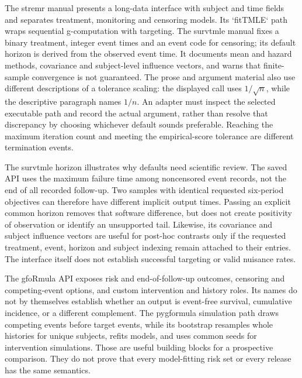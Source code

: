 The stremr manual presents a long-data interface with subject and time fields
and separates treatment, monitoring and censoring models. Its `fitTMLE` path
wraps sequential g-computation with targeting. The survtmle manual fixes a
binary treatment, integer event times and an event code for censoring; its
default horizon is derived from the observed event time. It documents mean and
hazard methods, covariance and subject-level influence vectors, and warns that
finite-sample convergence is not guaranteed. The prose and argument material
also use different descriptions of a tolerance scaling: the displayed call
uses $1/\sqrt n$, while the descriptive paragraph names $1/n$.
An adapter must inspect the selected executable path and record the actual
argument, rather than resolve that discrepancy by choosing whichever
default sounds preferable. Reaching the maximum iteration count and meeting
the empirical-score tolerance are different termination events.
\citep{v12_sw_stremr,v12_sw_survtmle}

The survtmle horizon illustrates why defaults need scientific review.
The saved API uses the maximum failure time among noncensored event records,
not the end of all recorded follow-up. Two samples with identical requested
six-period objectives can therefore have different implicit output times.
Passing an explicit common horizon removes that software difference, but
does not create positivity of observation or identify an unsupported tail.
Likewise, its covariance and subject influence vectors are useful for
post-hoc contrasts only if the requested treatment, event, horizon and
subject indexing remain attached to their entries. The interface itself
does not establish successful targeting or valid nuisance rates.

The gfoRmula API exposes risk and end-of-follow-up outcomes, censoring and
competing-event options, and custom intervention and history roles. Its names
do not by themselves establish whether an output is event-free survival,
cumulative incidence, or a different complement. The pygformula simulation
path draws competing events before target events, while its bootstrap resamples
whole histories for unique subjects, refits models, and uses common seeds for
intervention simulations. Those are useful building blocks for a prospective
comparison. They do not prove that every model-fitting risk set or every
release has the same semantics.\citep{sw_gformula,v13_sw_pygformula,v131_sw_pygformula}

